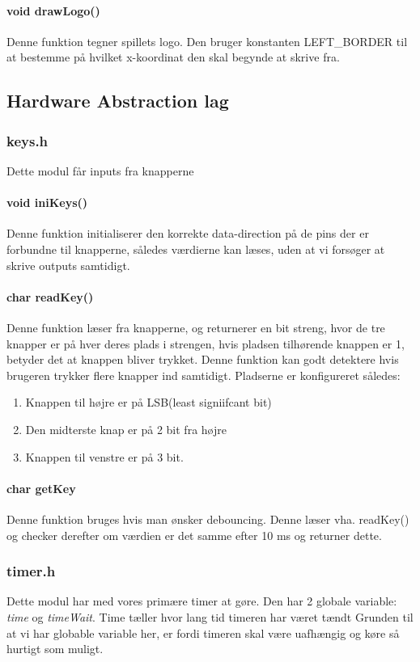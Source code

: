 \paragraph{void drawLogo()}
Denne funktion tegner spillets logo. Den bruger konstanten LEFT\_BORDER til at bestemme på hvilket x-koordinat den skal begynde at skrive fra.

\subsection{Hardware Abstraction lag}
\subsubsection{keys.h}
Dette modul får inputs fra knapperne 
\paragraph{void iniKeys()}
Denne funktion initialiserer den korrekte data-direction på de pins der er forbundne til knapperne, således værdierne kan læses, uden at vi forsøger at skrive outputs samtidigt.

\paragraph{char readKey()}
Denne funktion læser fra knapperne, og returnerer en bit streng, hvor de tre knapper er på hver deres plads i strengen, hvis pladsen tilhørende knappen er 1, betyder det at knappen bliver trykket. Denne funktion kan godt detektere hvis brugeren trykker flere knapper ind samtidigt. Pladserne er konfigureret således:
\begin{enumerate}
\item Knappen til højre er på LSB(least signiifcant bit)
\item Den midterste knap er på 2 bit fra højre
\item Knappen til venstre er på 3 bit.
\end{enumerate}

\paragraph{char getKey}
Denne funktion bruges hvis man ønsker debouncing. Denne læser vha. readKey() og checker derefter om værdien er det samme efter 10 ms og returner dette.
\subsubsection{timer.h}
Dette modul har med vores primære timer at gøre. Den har 2 globale variable: \textit{time} og \textit{timeWait}. Time tæller hvor lang tid timeren har været tændt Grunden til at vi har globable variable her, er fordi timeren skal være uafhængig og køre så hurtigt som muligt.
